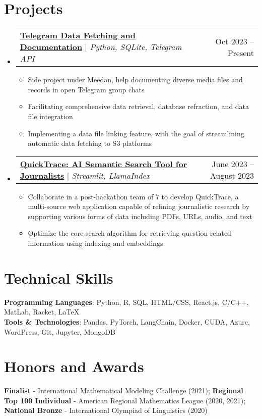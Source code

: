 \documentclass[letterpaper,11pt]{article}
\makeatletter
\newcommand{\resumeItem}[1]{
  \item\small{
    {#1 \vspace{-2pt}}
  }
}
\newcommand{\resumeProjectHeading}[2]{
    \item
    \begin{tabular*}{0.97\textwidth}{l@{\extracolsep{\fill}}r}
      \small#1 & #2 \\
    \end{tabular*}\vspace{-7pt}
}
\newcommand{\resumeSubHeadingListStart}{\begin{itemize}[leftmargin=0.15in, label={}]}
\newcommand{\resumeSubHeadingListEnd}{\end{itemize}}
\newcommand{\resumeItemListStart}{\begin{itemize}}
\newcommand{\resumeItemListEnd}{\end{itemize}\vspace{-5pt}}
\makeatother
\begin{document}
\section{Projects}
    \resumeSubHeadingListStart
    \resumeProjectHeading
        {\href{https://github.com/meedan/tg-archive}{\textbf{Telegram Data Fetching and Documentation}} $|$ \emph{Python, SQLite, Telegram API}}{Oct 2023 -- Present}
        \resumeItemListStart
            \resumeItem{Side project under Meedan, help documenting diverse media files and records in open Telegram group chats}
            \resumeItem{Facilitating comprehensive data retrieval, database refraction, and data file integration}
            \resumeItem{Implementing a data file linking feature, with the goal of streamlining automatic data fetching to S3 platforms}
        \resumeItemListEnd
    \resumeProjectHeading
       {\href{https://github.com/QuickTrace/quicktrace}{\textbf{QuickTrace: AI Semantic Search Tool for Journalists}} $|$ \emph{Streamlit, LlamaIndex}}{June 2023 -- August 2023}
          \resumeItemListStart
            \resumeItem{Collaborate in a post-hackathon team of 7 to develop QuickTrace, a multi-source web application capable of refining journalistic research by supporting various forms of data including PDFs, URLs, audio, and text}
            \resumeItem{Optimize the core search algorithm for retrieving question-related information using indexing and embeddings}
          \resumeItemListEnd
    \resumeSubHeadingListEnd

\section{Technical Skills}
 \begin{itemize}[leftmargin=0.15in, label={}]
    \small{\item{
     \textbf{Programming Languages}{: Python, R, SQL, HTML/CSS, React.js, C/C++,  MatLab, Racket, \LaTeX} \\
     \textbf{Tools \& Technologies}{: Pandas, PyTorch, LangChain, Docker, CUDA, Azure, WordPress, Git, Jupyter, MongoDB} \\
    }}
 \end{itemize}

\section{Honors and Awards}
 \begin{itemize}[leftmargin=0.15in, label={}]
    \small{\item{
     \textbf{Finalist} - International Mathematical Modeling Challenge (2021);  
     \textbf{Regional Top 100 Individual} - American Regional Mathematics League (2020, 2021); \textbf{National Bronze} - International Olympiad of Linguistics (2020)} \\
    }
 \end{itemize}



\end{document}
